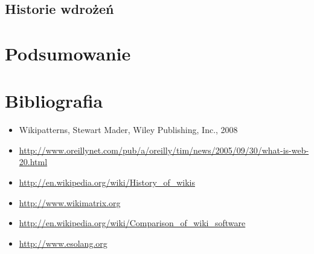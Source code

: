 \documentclass{article}
\begin{document}
	\subsection{Historie wdrożeń} %

\newpage
\section{Podsumowanie}

\newpage
\section{Bibliografia}
	\begin{itemize}
		\item 	Wikipatterns, Stewart Mader, Wiley Publishing, Inc., 2008
 		\item \url{http://www.oreillynet.com/pub/a/oreilly/tim/news/2005/09/30/what-is-web-20.html}
		\item \url{http://en.wikipedia.org/wiki/History_of_wikis}
		\item \url{http://www.wikimatrix.org}
		\item \url{http://en.wikipedia.org/wiki/Comparison_of_wiki_software}
		\item \url{http://www.esolang.org}
	\end{itemize}
\end{document}
